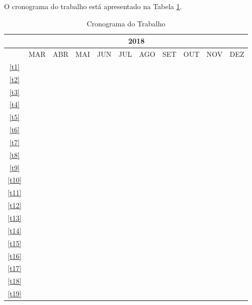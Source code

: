   O cronograma do trabalho está apresentado na Tabela \ref{tab:cronograma}.

  \begin{table}[!htbp]
    \centering
    \caption{Cronograma do Trabalho}
    \label{tab:cronograma}
      \begin{tabular}{|c|c|c|c|c|c|c|c|c|c|c|}
      \hline
      &\multicolumn{10}{c|}{2018}\\
      \hline
      &MAR&ABR&MAI&JUN&JUL&AGO&SET&OUT&NOV&DEZ\\
      \hline
      \ref{t1}&\cellcolor{green}&&&&&&&&&\\
      \hline
      \ref{t2}&\cellcolor{green}&\cellcolor{green}&&&&&&&&\\
      \hline
      \ref{t3}&\cellcolor{green}&&&&&&&&&\\
      \hline
      \ref{t4}&\cellcolor{green}&&&&&&&&&\\
      \hline
      \ref{t5}&&\cellcolor{green}&&&&&&&&\\
      \hline
      \ref{t6}&&&\cellcolor{green}&&&&&&&\\
      \hline
      \ref{t7}&&\cellcolor{green}&\cellcolor{green}&&&&&&&\\
      \hline
      \ref{t8}&&\cellcolor{green}&&&&&&&&\\
      \hline
      \ref{t9}&&\cellcolor{green}&\cellcolor{green}&&&&&&&\\
      \hline
      \ref{t10}&&\cellcolor{green}&\cellcolor{green}&\cellcolor{green}&&&&&&\\
      \hline
      \ref{t11}&&&&\cellcolor{yellow}&\cellcolor{yellow}&&&&&\\
      \hline
      \ref{t12}&&&&&\cellcolor{red}&\cellcolor{red}&&&&\\
      \hline
      \ref{t13}&&&&&\cellcolor{red}&\cellcolor{red}&&&&\\
      \hline
      \ref{t14}&&&&&\cellcolor{red}&\cellcolor{red}&&&&\\
      \hline
      \ref{t15}&&&&&\cellcolor{red}&\cellcolor{red}&&&&\\
      \hline
      \ref{t16}&&&&&\cellcolor{red}&\cellcolor{red}&&&&\\
      \hline
      \ref{t17}&&&&&&\cellcolor{red}&&&&\\
      \hline
      \ref{t18}&&&&&&\cellcolor{red}&\cellcolor{red}&&&\\
      \hline
      \ref{t19}&&&&&&&\cellcolor{red}&\cellcolor{red}&&\\

\end{tabular}
\end{table}
